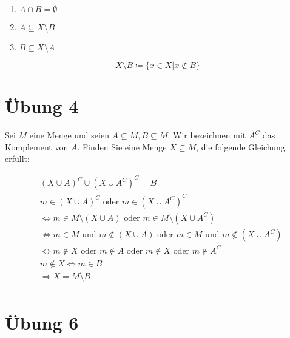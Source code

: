 \documentclass{article}
\begin{document}
\begin{enumerate}
\item $A \cap B = \emptyset$
\item $A \subseteq X \setminus B$
\item $B \subseteq X \setminus A$
\end{enumerate}

\[
  X \setminus B \coloneqq \{ x \in X | x \notin B\}
\]


\section*{Übung 4}

Sei $M$ eine Menge und seien $A \subseteq M, B \subseteq M$. Wir bezeichnen mit $A^C$ das Komplement von $A$.
Finden Sie eine Menge $X \subseteq M$, die folgende Gleichung erfüllt:

\begin{align*}
  &(X \cup A)^C \cup (X \cup A^C)^C = B \\
  &m \in (X \cup A)^C \text{ oder } m \in (X \cup A^C)^C \\
  &\iff m \in M \setminus (X \cup A) \text{ oder } m \in M \setminus (X \cup A^C) \\
  &\iff m \in M \text{ und } m \notin (X \cup A) \text{ oder } m \in M \text{ und } m \notin (X \cup A^C) \\
  &\iff m \notin X \text{ oder } m \notin A \text{ oder } m \notin X \text{ oder } m \notin A^C \\
  &m \notin X \iff m \in B \\
  &\Rightarrow X = M \setminus B \\
\end{align*}


\section*{Übung 6}
\end{document}
